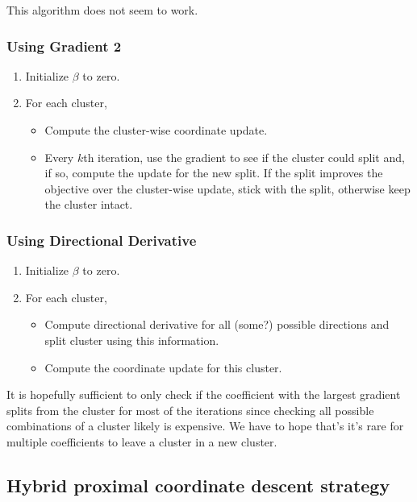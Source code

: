 This algorithm does not seem to work.

\subsubsection{Using Gradient 2}

\begin{enumerate}
  \item Initialize \(\beta\) to zero.
  \item For each cluster,
        \begin{itemize}
          \item Compute the cluster-wise coordinate update.
          \item Every \(k\)th iteration, use the gradient to see if the cluster
            could split and, if so, compute the update for the new split.
            If the split improves the objective over the cluster-wise update,
            stick with the split, otherwise keep the cluster intact.
        \end{itemize}
\end{enumerate}

\subsubsection{Using Directional Derivative}

\begin{enumerate}
  \item Initialize \(\beta\) to zero.
  \item For each cluster,
        \begin{itemize}
          \item Compute directional derivative for all (some?) possible 
                directions and split cluster using this information.
          \item Compute the coordinate update for this cluster.
        \end{itemize}
\end{enumerate}

It is hopefully sufficient to only check if the coefficient with the
largest gradient splits from the cluster for most of the iterations since
checking all possible combinations of a cluster likely is expensive.
We have
to hope that's it's rare for multiple coefficients to leave a cluster in
a new cluster.

\subsection{Hybrid proximal coordinate descent strategy}

